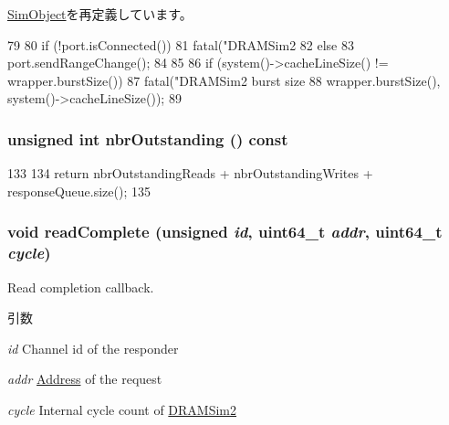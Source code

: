 \hyperlink{classSimObject_a02fd73d861ef2e4aabb38c0c9ff82947}{SimObject}を再定義しています。


\begin{DoxyCode}
79 {
80     if (!port.isConnected()) {
81         fatal("DRAMSim2 %
82     } else {
83         port.sendRangeChange();
84     }
85 
86     if (system()->cacheLineSize() != wrapper.burstSize())
87         fatal("DRAMSim2 burst size %
88               wrapper.burstSize(), system()->cacheLineSize());
89 }
\end{DoxyCode}
\hypertarget{classDRAMSim2_a034e8a2b3dd91f3ad9ca116c60aa3ea5}{
\subsubsection[{nbrOutstanding}]{\setlength{\rightskip}{0pt plus 5cm}unsigned int nbrOutstanding () const}}
\label{classDRAMSim2_a034e8a2b3dd91f3ad9ca116c60aa3ea5}



\begin{DoxyCode}
133 {
134     return nbrOutstandingReads + nbrOutstandingWrites + responseQueue.size();
135 }
\end{DoxyCode}
\hypertarget{classDRAMSim2_a8c698c38274256cd03843f1296ac9eed}{
\subsubsection[{readComplete}]{\setlength{\rightskip}{0pt plus 5cm}void readComplete (unsigned {\em id}, \/  uint64\_\-t {\em addr}, \/  uint64\_\-t {\em cycle})}}
\label{classDRAMSim2_a8c698c38274256cd03843f1296ac9eed}
Read completion callback.


\begin{DoxyParams}{引数}
\item[{\em id}]Channel id of the responder \item[{\em addr}]\hyperlink{classAddress}{Address} of the request \item[{\em cycle}]Internal cycle count of \hyperlink{classDRAMSim2}{DRAMSim2} \end{DoxyParams}



